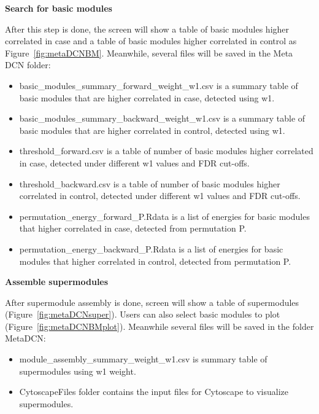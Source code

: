 \textbf{Search for basic modules}

After this step is done, the screen will show a table of basic modules higher correlated in case and a table of basic modules higher correlated in control as Figure~\ref{fig:metaDCNBM}. Meanwhile, several files will be saved in the Meta DCN folder:

\begin{itemize}
 \item basic\_modules\_summary\_forward\_weight\_w1.csv is a summary table of basic modules that are higher correlated in case, detected using w1.
 \item basic\_modules\_summary\_backward\_weight\_w1.csv is a summary table of basic modules that are higher correlated in control, detected using w1.
\item threshold\_forward.csv is a table of number of basic modules higher correlated in case, detected under different w1 values and FDR cut-offs.
\item threshold\_backward.csv is a table of number of basic modules higher correlated in control, detected under different w1 values and FDR cut-offs.
 \item permutation\_energy\_forward\_P.Rdata is a list of energies for basic modules that higher correlated in case, detected from permutation P.
  \item permutation\_energy\_backward\_P.Rdata is a list of energies for basic modules that higher correlated in control, detected from permutation P.
\end{itemize}


\textbf{Assemble supermodules}

After supermodule assembly is done, screen will show a table of supermodules (Figure~\ref{fig:metaDCNsuper}). Users can also select basic modules to plot (Figure~\ref{fig:metaDCNBMplot}). Meanwhile several files will be saved in the folder MetaDCN:
\begin{itemize}
\item module\_assembly\_summary\_weight\_w1.csv is summary table of supermodules using w1 weight.
\item CytoscapeFiles folder contains the input files for Cytoscape to visualize supermodules.
\end{itemize}

